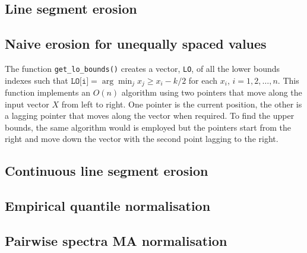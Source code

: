\documentclass[12pt,a4paper,oneside]{report}
\begin{document}
\begin{appendix}
	
	
\subsection{Line segment erosion} 



		
\subsection{Naive erosion for unequally spaced values}


The function \texttt{get\_lo\_bounds()} creates a vector, \texttt{LO}, of all the lower bounds indexes such that $\texttt{LO[i]}=\arg\min_{j} x_j \geq x_i - k/2$ for each $x_i$, $i=1,2,\hdots,n$. This function implements an $O (n)$ algorithm using two pointers that move along the input vector $X$ from left to right. One pointer is the current position, the other is a lagging pointer that moves along the vector when required. To find the upper bounds, the same algorithm would is employed but the pointers start from the right and move down the vector with the second point lagging to the right.\\



\subsection{Continuous line segment erosion} 





\subsection{Empirical quantile normalisation} 
	


\subsection{Pairwise spectra MA normalisation} 
	





\end{appendix}
\end{document}
